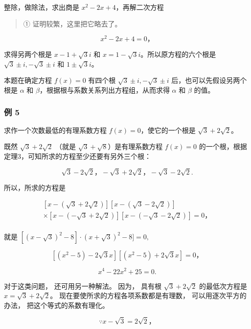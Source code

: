 整除，做除法，求出商是 \(x^{2} - 2x + 4\)，再解二次方程

\begin{quote}
① 证明较繁，这里把它略去了。
\end{quote}

\[
x ^ {2} - 2 x + 4 = 0\text{，}
\]

求得另两个根是 \(x - 1 + \sqrt{3}i\) 和
\(x = 1 - \sqrt{3}i\)。所以原方程的六个根是
\(\sqrt{3} \pm i, -\sqrt{3} \pm i\) 和 \(1 \pm \sqrt{3}i\)。

 本题在确定方程 \(f(x) = 0\) 有四个根
\(\sqrt{3} \pm i, -\sqrt{3} \pm i\) 后，也可以先假设另两个根是
\(\alpha\) 和 \(\beta\)，根据根与系数关系列出方程组，从而求得 \(\alpha\)
和 \(\beta\) 的值。

\subsubsection{例 5}

求作一个次数最低的有理系数方程 \(f(x) = 0\)，使它的一个根是
\(\sqrt{3} + 2\sqrt{2}\)。

 既然 \(\sqrt{3} + 2\sqrt{2}\) （就是
\(\sqrt{3} + \sqrt{8}\)）是有理系数方程 \(f(x) = 0\)
的一个根，根据定理3，可知所求的方程至少还要有另外三个根：

\[
\sqrt {3} - 2 \sqrt {2}\text{，} - \sqrt {3} + 2 \sqrt {2}\text{，} - \sqrt {3} - 2 \sqrt {2}.
\]

所以，所求的方程是

\[
\begin{array}{l} [ x - (\sqrt {3} + 2 \sqrt {2}) ] [ x - (\sqrt {3} - 2 \sqrt {2}) ] \\ \times [ x - (- \sqrt {3} + 2 \sqrt {2}) ] [ x - (- \sqrt {3} - 2 \sqrt {2}) ] = 0\text{，} \\ \end{array}
\]

就是
\(\left[(x - \sqrt{3})^2 - 8\right] \cdot (x + \sqrt{3})^2 - 8] = 0,\)

\[
[ (x ^ {2} - 5) - 2 \sqrt {3} x ] [ (x ^ {2} - 5) + 2 \sqrt {3} x ] = 0\text{，}
\]

\[
x ^ {4} - 22 x ^ {2} + 25 = 0.
\]

 对于这类问题， 还可用另一种解法。 因为， 具有根
\(\sqrt{3} + 2\sqrt{2}\) 的最低次方程是 \(x = \sqrt{3} + 2\sqrt{2}\)。
现在要使所求的方程各项系数都是有理数， 可以用逐次平方的办法，
把这个等式的系数有理化。

\[
\because x - \sqrt {3} = 2 \sqrt {2}\text{，}
\]

